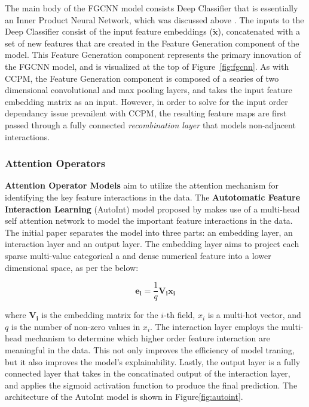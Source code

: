\documentclass{mldsmsc}
\begin{document}
The main body of the FGCNN model consists Deep Classifier that is essentially an Inner Product
Neural Network, which was discussed above \citep{RefWorks:qu2018product-based}. The inputs
to the Deep Classifier consist of the input feature embeddings ($\tilde{\mathbf{x}}$), concatenated
with a set of new features that are created in the Feature Generation component of the model. This
Feature Generation component represents the primary innovation of the FGCNN model, and is visualized
at the top of Figure~\ref{fig:fgcnn}. As with CCPM, the Feature Generation component is composed of
a searies of two dimensional convolutional and max pooling layers, and takes the input feature
embedding matrix as an input. However, in order to solve for the input order dependancy issue
prevailent with CCPM, the resulting feature maps are first passed through a fully connected \emph{recombination layer}
that models non-adjacent interactions.

\subsubsection{Attention Operators}

\textbf{Attention Operator Models} aim to utilize the attention mechanism for identifying
the key feature interactions in the data. The \textbf{Autotomatic Feature Interaction Learning} (AutoInt) 
model proposed by \cite{RefWorks:song2019autoint} makes use of a multi-head self attention
network to model the important feature interactions in the data. The initial 
paper separates the model into three parts: an embedding layer, an interaction layer 
and an output layer. The embedding layer aims to project each sparse multi-value
categorical a and dense numerical feature into a lower dimensional space, as per the below:

$$
\mathbf{e_i} = \frac{1}{q} \mathbf{V_i x_i}
$$

where $\mathbf{V_i}$ is the embedding matrix for the $i$-th field, $x_i$ is a multi-hot vector, and $q$ 
is the number of non-zero values in $x_i$. The interaction layer employs the multi-head
mechanism to determine which higher order feature interaction are meaningful in the data. This not only
improves the efficiency of model traning, but it also improves the model's explainability. Lastly,
the output layer is a fully connected layer that takes in the concatinated output 
of the interaction layer, and applies the sigmoid activation function to produce the final prediction.
The architecture of the AutoInt model is shown in Figure\ref{fig:autoint}.
\end{document}
